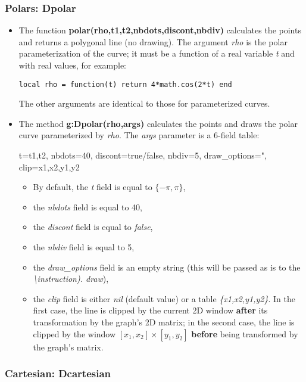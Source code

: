 \subsubsection{Polars: Dpolar}

\begin{itemize}
    \item The function \textbf{polar(rho,t1,t2,nbdots,discont,nbdiv)} calculates the points and returns a polygonal line (no drawing). The argument \emph{rho} is the polar parameterization of the curve; it must be a function of a real variable \emph{t} and with real values, for example:

\texttt{local rho = function(t) return 4*math.cos(2*t) end}

The other arguments are identical to those for parameterized curves.
    \item The method \textbf{g:Dpolar(rho,args)} calculates the points and draws the polar curve parameterized by \emph{rho}. The \emph{args} parameter is a 6-field table:

\begin{TeXcode}
{ t={t1,t2}, nbdots=40, discont=true/false, nbdiv=5, draw_options=", clip={x1,x2,y1,y2} }
\end{TeXcode}

\begin{itemize}
    \item By default, the \emph{t} field is equal to $\{-\pi,\pi\}$,
    \item the \emph{nbdots} field is equal to 40,
    \item the \emph{discont} field is equal to \emph{false},
    \item the \emph{nbdiv} field is equal to 5,
    \item the \emph{draw\_options} field is an empty string (this will be passed as is to the \emph{\textbackslash instruction). draw}),
    \item the \emph{clip} field is either \emph{nil} (default value) or a table \emph{\{x1,x2,y1,y2\}}. In the first case, the line is clipped by the current 2D window \textbf{after} its transformation by the graph's 2D matrix; in the second case, the line is clipped by the window $[x_1,x_2]\times[y_1,y_2]$ \textbf{before} being transformed by the graph's matrix.
\end{itemize}
\end{itemize}

\subsubsection{Cartesian: Dcartesian}

